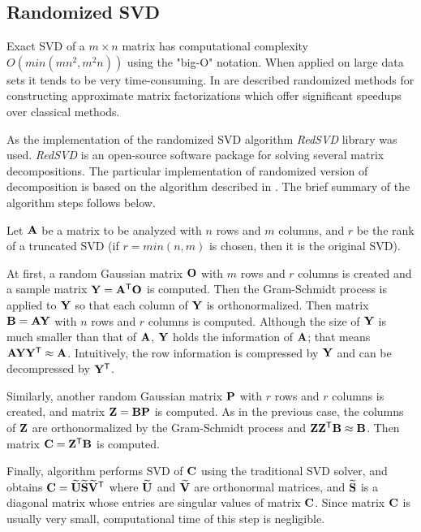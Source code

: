 \subsection{Randomized SVD}

Exact SVD of a $m \times n$ matrix has computational complexity $O(min(mn^2, m^2n))$ using the "big-O" notation. When applied on large data sets it tends to be very time-consuming. In \cite{Holmes2007, Candes2011, Woolfe2008, Martinsson2011} are described randomized methods for constructing approximate matrix factorizations which offer significant speedups over classical methods.

As the implementation of the randomized SVD algorithm \textit{RedSVD} library was used. \textit{RedSVD} is an open-source software package for solving several matrix decompositions. The particular implementation of randomized version of decomposition is based on the algorithm described in \cite{Halko2011}. The brief summary of the algorithm steps follows below.

Let $\mathbf{A}$ be a matrix to be analyzed with $n$ rows and $m$ columns, and $r$ be the rank of a truncated SVD (if $r = min(n, m)$ is chosen, then it is the original SVD).

At first, a random Gaussian matrix $\mathbf{O}$ with $m$ rows and $r$ columns is created and a sample matrix $\mathbf{Y} = \mathbf{A}^{\mathsf{T}} \mathbf{O}$ is computed. Then the Gram-Schmidt process is applied to $\mathbf{Y}$ so that each column of $\mathbf{Y}$ is orthonormalized. Then matrix $\mathbf{B} = \mathbf{A}\mathbf{Y}$ with $n$ rows and $r$ columns is computed. Although the size of $\mathbf{Y}$ is much smaller than that of $\mathbf{A}$, $\mathbf{Y}$ holds the information of $\mathbf{A}$; that means $\mathbf{A}\mathbf{Y}\mathbf{Y}^{\mathsf{T}} \approx \mathbf{A}$. Intuitively, the row information is compressed by $\mathbf{Y}$ and can be decompressed by $\mathbf{Y}^{\mathsf{T}}$.

Similarly, another random Gaussian matrix $\mathbf{P}$ with $r$ rows and $r$ columns is created, and matrix $\mathbf{Z} = \mathbf{B}\mathbf{P}$ is computed. As in the previous case, the columns of $\mathbf{Z}$ are orthonormalized by the Gram-Schmidt process and $\mathbf{Z}\mathbf{Z}^{\mathsf{T}} \mathbf{B} \approx \mathbf{B}$. Then matrix $\mathbf{C} = \mathbf{Z}^{\mathsf{T}} \mathbf{B}$ is computed.

Finally, algorithm performs SVD of $\mathbf{C}$ using the traditional SVD solver, and obtains $\mathbf{C} = \mathbf{\widetilde{U}}\mathbf{\widetilde{S}}\mathbf{\widetilde{V}}^{\mathsf{T}}$ where $\mathbf{\widetilde{U}}$ and $\mathbf{\widetilde{V}}$ are orthonormal matrices, and $\mathbf{\widetilde{S}}$ is a diagonal matrix whose entries are singular values of matrix $\mathbf{C}$. Since matrix $\mathbf{C}$ is usually very small, computational time of this step is negligible.

